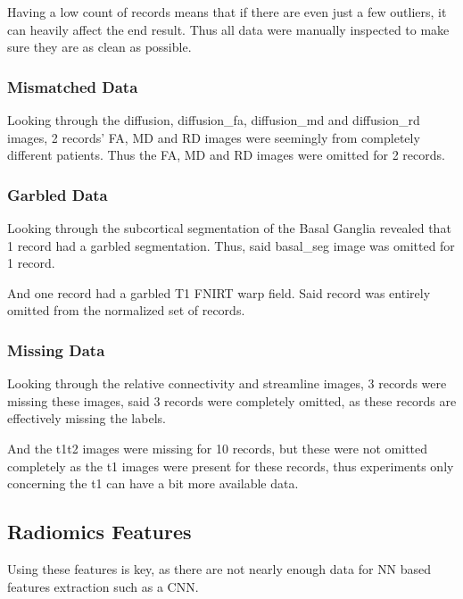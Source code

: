 Having a low count of records means that if there are even just a few outliers, it can heavily affect the end result. Thus all data were manually inspected to make sure they are as clean as possible.

\subsubsection{Mismatched Data}

Looking through the diffusion, diffusion\_fa, diffusion\_md and diffusion\_rd images, 2 records' \ac{FA}, \ac{MD} and \ac{RD} images were seemingly from completely different patients. Thus the \ac{FA}, \ac{MD} and \ac{RD} images were omitted for 2 records.

\subsubsection{Garbled Data}

Looking through the subcortical segmentation of the Basal Ganglia revealed that 1 record had a garbled segmentation. Thus, said basal\_seg image was omitted for 1 record.\par
And one record had a garbled T1 \ac{FNIRT} warp field. Said record was entirely omitted from the normalized set of records.

\subsubsection{Missing Data}

Looking through the relative connectivity and streamline images, 3 records were missing these images, said 3 records were completely omitted, as these records are effectively missing the labels.\par
And the t1t2 images were missing for 10 records, but these were not omitted completely as the t1 images were present for these records, thus experiments only concerning the t1 can have a bit more available data.

\subsection{Radiomics Features}

 Using these features is key, as there are not nearly enough data for \ac{NN} based features extraction such as a \ac{CNN}.\par

